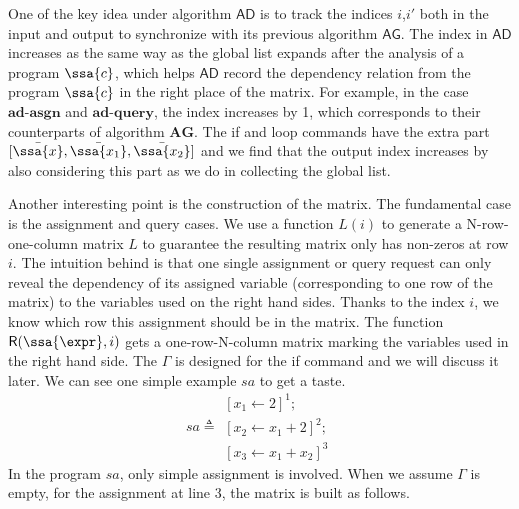 One of the key idea under algorithm $\mathsf{AD}$ is to track the indices $i$,$i'$ both in the input and output to synchronize with its previous algorithm $\mathsf{AG}$. The index in $\mathsf{AD}$ increases as the same way as the global list expands after the analysis of a program $\ssa{c}$, which helps $\mathsf{AD}$ record the dependency relation from the program $\ssa{c}$ in the right place of the matrix. For example, in the case $\textbf{ad-asgn}$ and $\textbf{ad-query}$, the index increases by 1, which corresponds to their counterparts of algorithm $\textbf{AG}$. The if and loop commands have the extra part $ [\bar{\ssa{x}}, \bar{\ssa{x_1}}, \bar{\ssa{x_2}}] $ and we find that the output index increases by also considering this part as we do in collecting the global list.  

Another interesting point is the construction of the matrix. The fundamental case is the assignment and query cases. We use a function $L(i)$ to generate a N-row-one-column matrix $L$ to guarantee the resulting matrix only has non-zeros at row $i$. The intuition behind is that one single assignment or query request can only reveal the dependency of its assigned variable (corresponding to one row of the matrix) to the variables used on the right hand sides. Thanks to the index $i$, we know which row this assignment should be in the matrix. The function $\mathsf{R}(\ssa{\expr},i)$ gets a one-row-N-column matrix marking the variables used in the right hand side. The $\Gamma$ is designed for the if command and we will discuss it later. We can see one simple example $sa$ to get a taste.     
\[
sa \triangleq
\begin{array}{l}
    \left[x_1 \leftarrow 2 \right]^1; \\
    \left[x_2 \leftarrow x_1 + 2 \right]^2 ; \\
    \left[x_3 \leftarrow x_1 + x_2 \right]^3
\end{array}
\]
In the program $sa$, only simple assignment is involved. When we assume $\Gamma$ is empty, for the assignment at line $3$, the matrix is built as follows.

